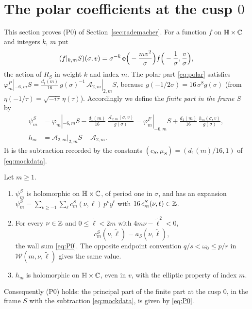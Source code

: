 \section{The polar coefficients at the cusp \texorpdfstring{$0$}{0}}\label{sec:polar0}

This section proves (P0) of Section~\ref{sec:rademacher}. For a function $f$ on $\mathbb H\times\mathbb{C}$ and integers $k$, $m$ put
\[
(f|_{k,m}S)(\sigma,v)=\sigma^{-k}\,\mathbf e\Big(-\frac{mv^2}{\sigma}\Big)f\Big(-\frac1\sigma,\frac v\sigma\Big),
\]
the action of $R_S$ in weight $k$ and index $m$. The polar part \eqref{eq:polar} satisfies $\varphi^P_m|_{-6,m}S=\frac{d_1(m)}{16}\,g(\sigma)^{-1}\,\mathcal A_{2,m}|_{2,m}S$, because $g(-1/2\sigma)=16\,\sigma^8g(\sigma)$ (from $\eta(-1/\tau)=\sqrt{-i\tau}\,\eta(\tau)$). Accordingly we define the \emph{finite part in the frame $S$} by
\begin{equation}\label{eq:psiS}
\begin{aligned}
\psi^S_m&=\varphi_m|_{-6,m}S-\frac{d_1(m)}{16}\,\frac{\mathcal A_{2,m}(\sigma,v)}{g(\sigma)}
=\varphi^F_m|_{-6,m}S+\frac{d_1(m)}{16}\,\frac{h_m(\sigma,v)}{g(\sigma)},\\
h_m&=\mathcal A_{2,m}|_{2,m}S-\mathcal A_{2,m}.
\end{aligned}
\end{equation}
It is the subtraction recorded by the constants $(c_S,\mu_S)=(d_1(m)/16,1)$ of \eqref{eq:mockdata}.

\begin{theorem}\label{thm:P0}
Let $m\ge1$.
\begin{enumerate}
\item[(i)] $\psi^S_m$ is holomorphic on $\mathbb H\times\mathbb{C}$, of period one in $\sigma$, and has an expansion $\psi^S_m=\sum_{\nu\ge-1}\sum_{\ell}c^S_m(\nu,\ell)\,p^\nu y^\ell$ with $16\,c^S_m(\nu,\ell)\in\mathbb{Z}$.
\item[(ii)] For every $\nu\in\mathbb{Z}$ and $0\le\tilde\ell<2m$ with $4m\nu-\tilde\ell^2<0$,
\[
c^S_m(\nu,\tilde\ell)=a_S(\nu,\tilde\ell),
\]
the wall sum \eqref{eq:P0}. The opposite endpoint convention $q/s<\omega_0\le p/r$ in $\mathcal W(m,\nu,\tilde\ell)$ gives the same value.
\item[(iii)] $h_m$ is holomorphic on $\mathbb H\times\mathbb{C}$, even in $v$, with the elliptic property of index $m$.
\end{enumerate}
Consequently (P0) holds: the principal part of the finite part at the cusp $0$, in the frame $S$ with the subtraction \eqref{eq:mockdata}, is given by \eqref{eq:P0}.
\end{theorem}

